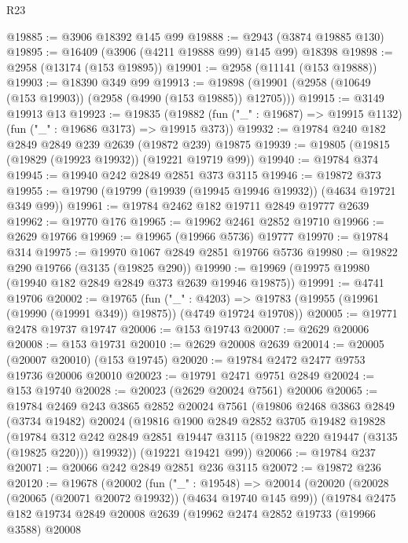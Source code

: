 \begin{lexlean}{R23}
\begin{coremodule}
@19885 := @3906 @18392 @145 @99
@19888 := @2943 (@3874 @19885 @130)
@19895 := @16409 (@3906 (@4211 @19888 @99) @145 @99) @18398
@19898 := @2958 (@13174 (@153 @19895))
@19901 := @2958 (@11141 (@153 @19888))
@19903 := @18390 @349 @99
@19913 := @19898 (@19901 (@2958 (@10649 (@153 @19903)) (@2958 (@4990 (@153 @19885)) @12705)))
@19915 := @3149 @19913 @13
@19923 := @19835
    (@19882 (fun ("_" : @19687) => @19915 @1132) (fun ("_" : @19686 @3173) => @19915 @373))
@19932 := @19784 @240 @182 @2849 @2849 @239 @2639 (@19872 @239) @19875
@19939 := @19805 (@19815 (@19829 (@19923 @19932)) (@19221 @19719 @99))
@19940 := @19784 @374
@19945 := @19940 @242 @2849 @2851 @373 @3115
@19946 := @19872 @373
@19955 := @19790 (@19799 (@19939 (@19945 @19946 @19932)) (@4634 @19721 @349 @99))
@19961 := @19784 @2462 @182 @19711 @2849 @19777 @2639
@19962 := @19770 @176
@19965 := @19962 @2461 @2852 @19710
@19966 := @2629 @19766
@19969 := @19965 (@19966 @5736) @19777
@19970 := @19784 @314
@19975 := @19970 @1067 @2849 @2851 @19766 @5736
@19980 := @19822 @290 @19766 (@3135 (@19825 @290))
@19990 := @19969 (@19975 @19980 (@19940 @182 @2849 @2849 @373 @2639 @19946 @19875))
@19991 := @4741 @19706
@20002 := @19765
    (fun ("_" : @4203) =>
    @19783 (@19955 (@19961 (@19990 (@19991 @349)) @19875)) (@4749 @19724 @19708))
@20005 := @19771 @2478 @19737 @19747
@20006 := @153 @19743
@20007 := @2629 @20006
@20008 := @153 @19731
@20010 := @2629 @20008 @2639
@20014 := @20005 (@20007 @20010) (@153 @19745)
@20020 := @19784 @2472 @2477 @9753 @19736 @20006 @20010
@20023 := @19791 @2471 @9751 @2849
@20024 := @153 @19740
@20028 := @20023 (@2629 @20024 @7561) @20006
@20065 := @19784
    @2469
    @243
    @3865
    @2852
    @20024
    @7561
    (@19806
      @2468
      @3863
      @2849
      (@3734 @19482)
      @20024
      (@19816
        @1900
        @2849
        @2852
        @3705
        @19482
        @19828
        (@19784
          @312
          @242
          @2849
          @2851
          @19447
          @3115
          (@19822 @220 @19447 (@3135 (@19825 @220)))
          @19932))
      (@19221 @19421 @99))
@20066 := @19784 @237
@20071 := @20066 @242 @2849 @2851 @236 @3115
@20072 := @19872 @236
@20120 := @19678
    (@20002
      (fun ("_" : @19548) =>
      @20014
        (@20020
          (@20028 (@20065 (@20071 @20072 @19932)) (@4634 @19740 @145 @99))
          (@19784
            @2475
            @182
            @19734
            @2849
            @20008
            @2639
            (@19962
              @2474
              @2852
              @19733
              (@19966 @3588)
              @20008

\end{coremodule}
\end{lexlean}
